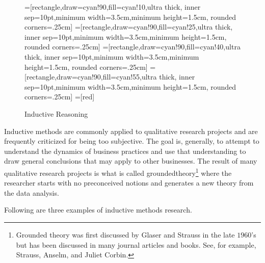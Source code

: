 \begin{center}
	\begin{figure}[H]
		=[rectangle,draw=cyan!90,fill=cyan!10,ultra thick,
		inner sep=10pt,minimum width=3.5cm,minimum height=1.5cm,
		rounded corners=.25cm]
		=[rectangle,draw=cyan!90,fill=cyan!25,ultra thick,
		inner sep=10pt,minimum width=3.5cm,minimum height=1.5cm,
		rounded corners=.25cm]
		=[rectangle,draw=cyan!90,fill=cyan!40,ultra thick,
		inner sep=10pt,minimum width=3.5cm,minimum height=1.5cm,
		rounded corners=.25cm]
		=[rectangle,draw=cyan!90,fill=cyan!55,ultra thick,
		inner sep=10pt,minimum width=3.5cm,minimum height=1.5cm,
		rounded corners=.25cm]			
		=[red]
		\caption{Inductive Reasoning}
		\label{02:fig05}
	\end{figure}
\end{center}

Inductive methods are commonly applied to qualitative research projects and are frequently criticized for being too subjective. The goal is, generally, to attempt to understand the dynamics of business practices and use that understanding to draw general conclusions that may apply to other businesses. The result of many qualitative research projects is what is called \gls{groundedtheory}\footnote{Grounded theory was first discussed by Glaser and Strauss in the late $ 1960 $'s but has been discussed in many journal articles and books. See, for example, Strauss, Anselm, and Juliet Corbin\cite{strauss1994grounded}.} where the researcher starts with no preconceived notions and generates a new theory from the data analysis.

Following are three examples of inductive methods research.

